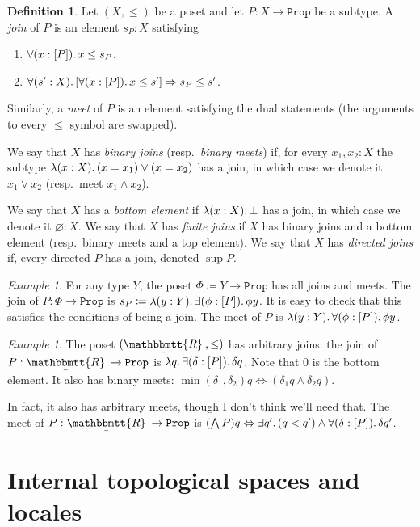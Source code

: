 \documentclass[11pt, oneside, article]{memoir}
\theoremstyle{plain}
\theoremstyle{definition}
\newtheorem{definition}[theorem]{Definition}
\theoremstyle{remark}
\newtheorem{example}[theorem]{Example}
\DeclarePairedDelimiter{\subtype}{[}{]}
\newcommand{\const}[1]{\mathtt{#1}}
\newcommand{\ubar}[1]{\underaccent{\bar}{#1}}
\newcommand{\internal}[1]{\raisebox{-.03ex}{$\mathbbmtt{#1}$}}
\newcommand{\hs}{\hspace{1.1pt}}
\newcommand{\tRR}{\internal{R}\hs}
\newcommand{\tLR}{\ubar{\tRR}\hs}
\newcommand{\Prop}{\const{Prop}}
\newcommand{\imp}{\Rightarrow}
\renewcommand{\iff}{\Leftrightarrow}
\begin{document}
\begin{definition}
Let $(X,\leq)$ be a poset and let $P:X\to\Prop$ be a subtype. A \emph{join} of $P$ is an element $s_P:X$ satisfying
\begin{enumerate}
	\item $\forall(x:\subtype{P})\ldotp x\leq s_P$.
	\item $\forall(s':X)\ldotp[\forall(x:\subtype{P})\ldotp x\leq s']\imp s_P\leq s'$.
\end{enumerate}
Similarly, a \emph{meet} of $P$ is an element satisfying the dual statements (the arguments to every $\leq$ symbol are swapped).

We say that $X$ has \emph{binary joins} (resp.\ \emph{binary meets}) if, for every $x_1,x_2:X$ the subtype $\lambda(x:X)\ldotp (x=x_1) \vee (x=x_2)$ has a join, in which case we denote it $x_1\vee x_2$ (resp.\ meet $x_1\wedge x_2$). 

We say that $X$ has a \emph{bottom element} if $\lambda(x:X)\ldotp \bot$ has a join, in which case we denote it $\varnothing:X$. We say that $X$ has \emph{finite joins} if $X$ has binary joins and a bottom element (resp.\ binary meets and a top element). We say that $X$ has \emph{directed joins} if, every directed $P$ has a join, denoted $\sup P$.
\end{definition}

\begin{example}
For any type $Y$, the poset $\Phi\coloneqq Y\to\Prop$ has all joins and meets. The join of $P:\Phi\to\Prop$ is $s_P\coloneqq\lambda(y:Y)\ldotp\exists(\phi:\subtype{P})\ldotp\phi y$. It is easy to check that this satisfies the conditions of being a join. The meet of $P$ is $\lambda(y:Y)\ldotp\forall(\phi:\subtype{P})\ldotp\phi y$.
\end{example}

\begin{example}
The poset $(\tLR,\leq)$ has arbitrary joins: the join of $P:\tLR\to\Prop$ is $\lambda q\ldotp\exists(\delta:\subtype{P})\ldotp\delta q$. Note that $0$ is the bottom element. It also has binary meets: $\min(\delta_1,\delta_2)q\iff(\delta_1 q\wedge \delta_2q)$.

In fact, it also has arbitrary meets, though I don't think we'll need that. The meet of $P:\tLR\to\Prop$ is $(\bigwedge P)q\iff\exists q'\ldotp (q<q')\wedge\forall(\delta:\subtype{P})\ldotp\delta q'$.
\end{example}

\section{Internal topological spaces and locales}
\end{document}
